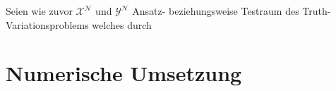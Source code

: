 Seien wie zuvor $\mathcal X^{\mathcal N}$ und $\mathcal Y^{\mathcal N}$ Ansatz- beziehungsweise Testraum des Truth-Variationsproblems welches durch
\begin{equation}

\end{equation}




\section{Numerische Umsetzung} %
\label{sub:grb:rb:numerische_umsetzung}



